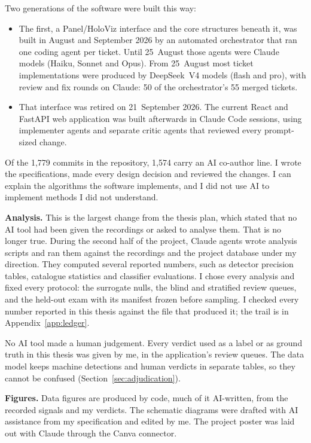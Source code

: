 Two generations of the software were built this way:
\begin{itemize}
  \item The first, a Panel/HoloViz interface and the core structures beneath it, was built in August and September 2026 by an automated orchestrator that ran one coding agent per ticket. Until 25~August those agents were Claude models (Haiku, Sonnet and Opus). From 25~August most ticket implementations were produced by DeepSeek~V4 models (flash and pro), with review and fix rounds on Claude: 50 of the orchestrator's 55 merged tickets.
  \item That interface was retired on 21~September 2026. The current React and FastAPI web application was built afterwards in Claude Code sessions, using implementer agents and separate critic agents that reviewed every prompt-sized change.
\end{itemize}

Of the 1,779 commits in the repository, 1,574 carry an AI co-author line. I wrote the specifications, made every design decision and reviewed the changes. I can explain the algorithms the software implements, and I did not use AI to implement methods I did not understand.

\textbf{Analysis.} This is the largest change from the thesis plan, which stated that no AI tool had been given the recordings or asked to analyse them. That is no longer true. During the second half of the project, Claude agents wrote analysis scripts and ran them against the recordings and the project database under my direction. They computed several reported numbers, such as detector precision tables, catalogue statistics and classifier evaluations. I chose every analysis and fixed every protocol: the surrogate nulls, the blind and stratified review queues, and the held-out exam with its manifest frozen before sampling. I checked every number reported in this thesis against the file that produced it; the trail is in Appendix~\ref{app:ledger}.

No AI tool made a human judgement. Every verdict used as a label or as ground truth in this thesis was given by me, in the application's review queues. The data model keeps machine detections and human verdicts in separate tables, so they cannot be confused (Section~\ref{sec:adjudication}).

\textbf{Figures.} Data figures are produced by code, much of it AI-written, from the recorded signals and my verdicts. The schematic diagrams were drafted with AI assistance from my specification and edited by me. The project poster was laid out with Claude through the Canva connector.

